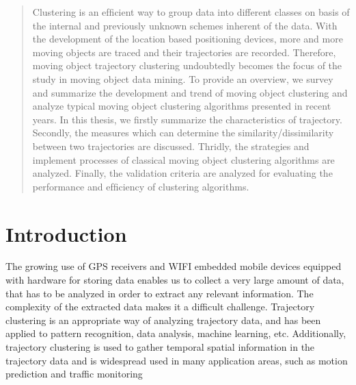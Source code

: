 \documentclass[a4paper, 12pt]{article}
\begin{document}



\tableofcontents

\listoftables

\listoffigures

\listofmyequations

\cleardoublepage

\begin{abstract} 
Clustering is an efﬁcient way to group data into different classes on basis of the internal and previously unknown schemes inherent of the data. With the development of the location based positioning devices, more and more moving objects are traced and their trajectories are recorded. Therefore, moving object trajectory clustering undoubtedly becomes the focus of the study in moving object data mining. To provide an overview, we survey and summarize the development and trend of moving object clustering and analyze typical moving object clustering algorithms presented in recent years. In this thesis, we ﬁrstly summarize the characteristics of trajectory. Secondly, the measures which can determine the similarity/dissimilarity between two trajectories are discussed. Thridly, the strategies and implement processes of classical moving object clustering
algorithms are analyzed. Finally, the validation criteria are analyzed for evaluating the performance and efﬁciency of clustering algorithms. 
\end{abstract}

\pagebreak


\section{Introduction}
The growing use of GPS receivers and WIFI embedded mobile devices equipped with hardware for storing data enables us to collect a very large amount of data, that has to be analyzed in order to extract any relevant information. The complexity of the extracted data makes it a difficult challenge. Trajectory clustering is an appropriate way of analyzing trajectory data, and has been applied to pattern recognition, data analysis, machine learning, etc. Additionally, trajectory clustering is used to gather temporal spatial information in the trajectory data and is widespread used in many application areas, such as motion prediction \citep{chen2010searching} and traffic monitoring \citep{atev2006learning}
\end{document}
